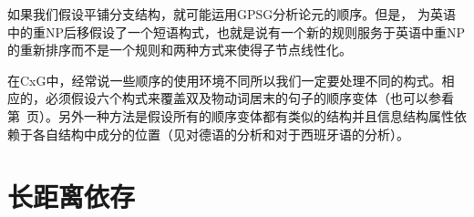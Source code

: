 如果我们假设平铺分支结构，就可能运用GPSG分析\indexgpsgc 论元的顺序。但是， \citet{Kay2002a}为英语中的重NP后移假设了一个短语构式，也就是说有一个新的规则服务于英语中重NP的重新排序而不是一个规则和两种方式来使得子节点线性化。

在CxG中，经常说一些顺序的使用环境不同所以我们一定要处理不同的构式。相应的，必须假设六个构式来覆盖双及物动词居末的句子的顺序变体（也可以参看第~\pageref{Regeln-PSG-Abfolge}页）。另外一种方法是假设所有的顺序变体都有类似的结构并且信息结构属性依赖于各自结构中成分的位置（见\citealp{deKuthy2000a}对德语的分析和\citealp{Bildhauer2008a}对于西班牙语的分析）。

\section{长距离依存}

